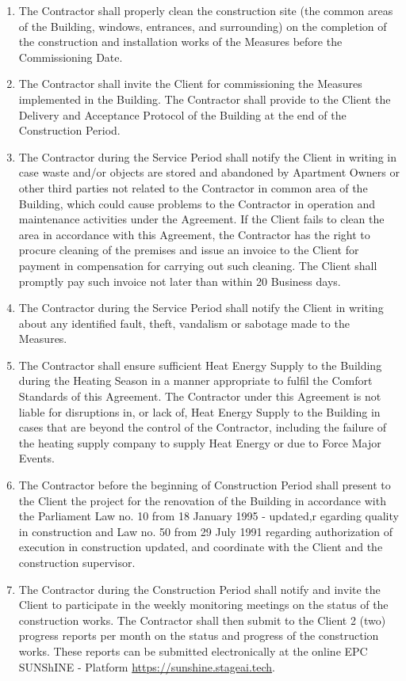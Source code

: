 \begin{multicols}{2}
\begin{enumerate}
	\item The Contractor shall properly clean the construction site (the common areas of the Building, windows, entrances, and surrounding) on the completion of the construction and installation works of the Measures before the Commissioning Date.
	\item The Contractor shall invite the Client for commissioning the Measures implemented in the Building. The Contractor shall provide to the Client the Delivery and Acceptance Protocol of the Building at the end of the Construction Period.
	\item The Contractor during the Service Period shall notify the Client in writing in case waste and/or objects are stored and abandoned by Apartment Owners or other third parties not related to the Contractor in common area of the Building, which could cause problems to the Contractor in operation and maintenance activities under the Agreement. If the Client fails to clean the area in accordance with this Agreement, the Contractor has the right to procure cleaning of the premises and issue an invoice to the Client for payment in compensation for carrying out such cleaning. The Client shall promptly pay such invoice not later than within 20 Business days.
	\item The Contractor during the Service Period shall notify the Client in writing about any identified fault, theft, vandalism or sabotage made to the Measures.
	\item The Contractor shall ensure sufficient Heat Energy Supply to the Building during the Heating Season in a manner appropriate to fulfil the Comfort Standards of this Agreement. The Contractor under this Agreement is not liable for disruptions in, or lack of, Heat Energy Supply to the Building in cases that are beyond the control of the Contractor, including the failure of the heating supply company to supply Heat Energy or due to Force Major Events.
	\item The Contractor before the beginning of Construction Period shall present to the Client the project for the renovation of the Building in accordance with the Parliament Law no. 10 from 18 January 1995 - updated,r egarding quality in construction and Law no. 50 from 29 July 1991 regarding authorization of execution in construction updated, and coordinate with the Client and the construction supervisor.
	\item The Contractor during the Construction Period shall notify and invite the Client to participate in the weekly monitoring meetings on the status of the construction works. The Contractor shall then submit to the Client 2 (two) progress reports per month on the status and progress of the construction works. These reports can be submitted electronically at the online EPC SUNShINE - Platform \url{https://sunshine.stageai.tech}.

\end{enumerate}
\end{multicols}
